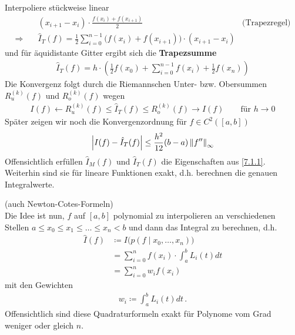 Interpoliere stückweise linear
\label{im7.1.3}
\begin{align}\nonumber
  &(x_{i+1}-x_i)\cdot \frac{f(x_i)+f(x_{i+1})}{2} 
  &\text{(Trapezregel)}\\
  \Rightarrow\quad
  & \hat{I}_T(f) = \frac{1}{2}\sum_{i=0}^{n-1}
    \big(
    f(x_i)+f(x_{i+1})
    \big)
    \cdot (x_{i+1}-x_i)
    \label{VII.1.6}
\end{align}
und für äquidistante Gitter ergibt sich die \textbf{Trapezsumme}
\begin{gather}
  \hat{I}_T(f) = h\cdot\left( \frac{1}{2}f(x_0)
    +\sum_{i=0}^{n-1}f(x_i)
    +\frac{1}{2} f(x_n)
  \right)
  \label{VII.1.7}
\end{gather}
Die Konvergenz folgt durch die Riemannschen Unter- bzw. Obersummen
$R_u^{(k)}(f)$ und $R_o^{(k)}(f)$ wegen
\begin{gather*}
  I(f)\longleftarrow R_u^{(k)}(f)
  \leq \hat{I}_T(f)
  \leq R_o^{(k)}(f)\longrightarrow I(f)
  \qquad \text{für } h\longrightarrow 0
\end{gather*}
Später zeigen wir noch die Konvergenzordnung für $f\in C^2([a,b])$
\begin{gather}
  \left| I(f)-\hat{I}_T(f)\right| \leq \frac{h^2}{12}(b-a)\left\| f'' \right\|_\infty
  \label{VII.1.8}
\end{gather}
Offensichtlich erfüllen $\hat{I}_M(f)$ und $\hat{I}_T(f)$
die Eigenschaften aus \ref{7.1.1}.
Weiterhin sind sie für lineare Funktionen exakt,
d.h. berechnen die genauen Integralwerte.


(auch Newton-Cotes-Formeln)\\
Die Idee ist nun, $f$ auf $[a,b]$ polynomial zu interpolieren
an verschiedenen Stellen $a\leq x_0\leq x_1\leq \dots\leq x_n<b$
und dann das Integral zu berechnen, d.h.
\begin{align}\nonumber
  \hat{I}(f) &\coloneqq I\big( p(f\mid x_0,\dots, x_n)\big)\\\nonumber
             &=\sum_{i=0}^{n}f(x_i)
               \cdot \int_a^bL_i(t)dt\\
             &=\sum_{i=0}^{n} w_if(x_i)
               \label{VII.2.1}
\end{align}
mit den Gewichten 
\begin{gather}
  w_i\coloneqq \int_a^bL_i(t)dt\, .
  \label{VII.2.2}
\end{gather}
Offensichtlich sind diese Quadraturformeln exakt
für Polynome vom Grad weniger oder gleich $n$.

